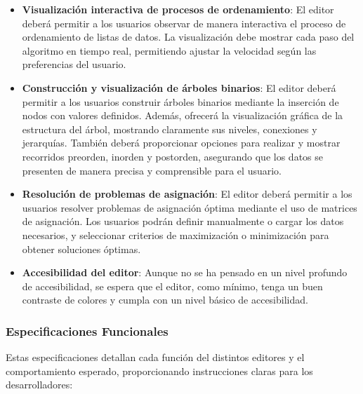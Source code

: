 \documentclass[stu, 12pt, letterpaper, donotrepeattitle, floatsintext, natbib]{apa7}
\begin{document}
\begin{itemize}
    \item \textbf{Visualización interactiva de procesos de ordenamiento}:
    El editor deberá permitir a los usuarios observar de manera interactiva el proceso de ordenamiento de listas de datos. La visualización debe mostrar cada paso del algoritmo en tiempo real, permitiendo ajustar la velocidad según las preferencias del usuario. 

    \item \textbf{Construcción y visualización de árboles binarios}:
    El editor deberá permitir a los usuarios construir árboles binarios mediante la inserción de nodos con valores definidos. Además, ofrecerá la visualización gráfica de la estructura del árbol, mostrando claramente sus niveles, conexiones y jerarquías. También deberá proporcionar opciones para realizar y mostrar recorridos preorden, inorden y postorden, asegurando que los datos se presenten de manera precisa y comprensible para el usuario.

    \item \textbf{Resolución de problemas de asignación}:
    El editor deberá permitir a los usuarios resolver problemas de asignación óptima mediante el uso de matrices de asignación. Los usuarios podrán definir manualmente o cargar los datos necesarios, y seleccionar criterios de maximización o minimización para obtener soluciones óptimas.
    
    \item \textbf{Accesibilidad del editor}: 
    Aunque no se ha pensado en un nivel profundo de accesibilidad, se espera que el editor, como mínimo, tenga un buen contraste de colores y cumpla con un nivel básico de accesibilidad.
\end{itemize}


\subsubsection{Especificaciones Funcionales}

Estas especificaciones detallan cada función del distintos editores y el comportamiento esperado, proporcionando instrucciones claras para los desarrolladores:
\end{document}
